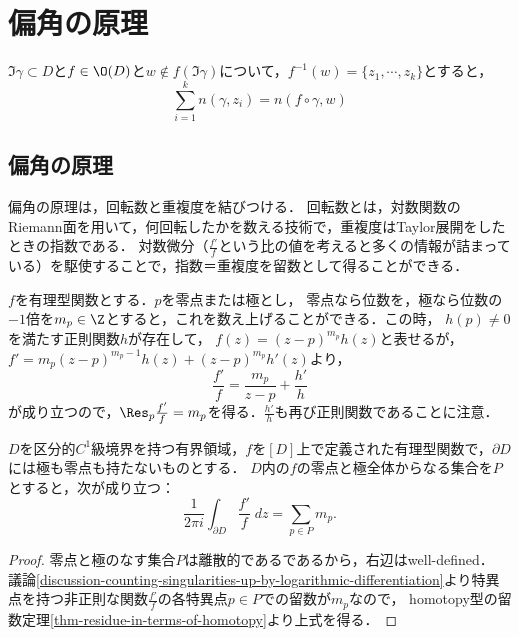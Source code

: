 \documentclass[uplatex, dvipdfmx]{jsreport}
\begin{document}
\section{偏角の原理}

\begin{tcolorbox}[colframe=ForestGreen, colback=ForestGreen!10!white,breakable,colbacktitle=ForestGreen!40!white,coltitle=black,fonttitle=\bfseries\sffamily,
title=偏角の原理：回転数は連続写像について保存する]
    $\Im\gamma\subset D$と$f\in\O(D)$と$w\notin f(\Im\gamma)$について，$f^{-1}(w)=\{z_1,\cdots,z_k\}$とすると，
    \[\sum_{i=1}^kn(\gamma,z_i)=n(f\circ\gamma,w)\]
\end{tcolorbox}

\subsection{偏角の原理}

\begin{tcolorbox}[colframe=ForestGreen, colback=ForestGreen!10!white,breakable,colbacktitle=ForestGreen!40!white,coltitle=black,fonttitle=\bfseries\sffamily,
title=]
    偏角の原理は，回転数と重複度を結びつける．
    回転数とは，対数関数のRiemann面を用いて，何回転したかを数える技術で，重複度はTaylor展開をしたときの指数である．
    対数微分（$\frac{f'}{f}$という比の値を考えると多くの情報が詰まっている）を駆使することで，指数＝重複度を留数として得ることができる．
\end{tcolorbox}

\begin{discussion}[位数を含めた数え上げ]\label{discussion-counting-singularities-up-by-logarithmic-differentiation}
    $f$を有理型関数とする．$p$を零点または極とし，
    零点なら位数を，極なら位数の$-1$倍を$m_p\in\Z$とすると，これを数え上げることができる．この時，
    $h(p)\ne 0$を満たす正則関数$h$が存在して，
    $f(z)=(z-p)^{m_p}h(z)$と表せるが，
    $f'=m_p(z-p)^{m_p-1}h(z)+(z-p)^{m_p}h'(z)$より，
    \[\frac{f'}{f}=\frac{m_p}{z-p}+\frac{h'}{h}\]
    が成り立つので，$\Res_p\frac{f'}{f}=m_p$を得る．$\frac{h'}{h}$も再び正則関数であることに注意．
\end{discussion}

\begin{theorem}\label{thm-argument-principle}
    $D$を区分的$C^1$級境界を持つ有界領域，$f$を$[D]$上で定義された有理型関数で，$\partial D$には極も零点も持たないものとする．
    $D$内の$f$の零点と極全体からなる集合を$P$とすると，次が成り立つ：
    \[\frac{1}{2\pi i}\int_{\partial D}\frac{f'}{f}\;dz=\sum_{p\in P}m_p.\]
\end{theorem}
\begin{proof}
    零点と極のなす集合$P$は離散的であるであるから，右辺はwell-defined．
    議論\ref{discussion-counting-singularities-up-by-logarithmic-differentiation}より特異点を持つ非正則な関数$\frac{f'}{f}$の各特異点$p\in P$での留数が$m_p$なので，
    homotopy型の留数定理\ref{thm-residue-in-terms-of-homotopy}より上式を得る．
\end{proof}
\end{document}
